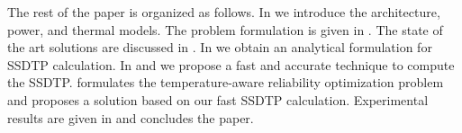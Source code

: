 The rest of the paper is organized as follows. In  we introduce the architecture, power, and thermal models. The problem formulation is given in . The state of the art solutions are discussed in . In  we obtain an analytical formulation for SSDTP calculation. In  and  we propose a fast and accurate technique to compute the SSDTP.  formulates the temperature-aware reliability optimization problem and proposes a solution based on our fast SSDTP calculation. Experimental results are given in  and  concludes the paper.
